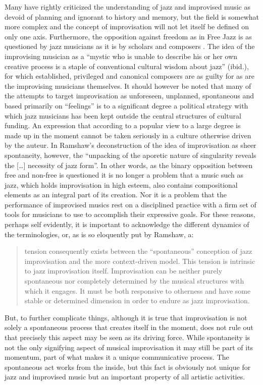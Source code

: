 \documentclass[a4paper]{article}
\begin{document}
Many have rightly criticized the understanding of jazz and improvised music as devoid of planning and ignorant to history and memory, but the field is somewhat more complex and the concept of improvisation will not let itself be defined on only one axis. Furthermore, the opposition against freedom as in Free Jazz is as questioned by jazz musicians as it is by scholars and composers \citep{lewis-1}. The idea of the improvising musician as a ``mystic who is unable to describe his or her own creative process is a staple of conventional cultural wisdom about jazz'' (ibid.), for which established, privileged and canonical composers are as guilty for as are the improvising musicians themselves. It should however be noted that many of the attempts to target improvisation as unforeseen, unplanned, spontaneous and based primarily on ``feelings'' is to a significant degree a political strategy with which jazz musicians has been kept outside the central structures of cultural funding. An expression that according to a popular view to a large degree is made up in the moment cannot be taken seriously in a culture otherwise driven by the auteur. In Ramshaw's deconstruction of the idea of improvisation as sheer spontaneity, however, the ``unpacking of the aporetic nature of singularity reveals the [\ldots] necessity of jazz form''. In other words, as the binary opposition between free and non-free is questioned it is no longer a problem that a music such as jazz, which holds improvisation in high esteem, also contains compositional elements as an integral part of its creation. Nor it is a problem that the performance of improvised musics rest on a disciplined practice with a firm set of tools for musicians to use to accomplish their expressive goals. For these reasons, perhaps self evidently, it is important to acknowledge the different dynamics of the terminologies, or, as is so eloquently put by Ramshaw, a:

\begin{quote}
 tension consequently exists between the ``spontaneous'' conception of jazz improvisation and   the more context-driven model. This tension is intrinsic to jazz improvisation   itself. Improvisation can be neither purely spontaneous nor completely determined by the   musical structures with which it engages. It must be both responsive to otherness and have   some stable or determined dimension in order to endure as jazz improvisation. \citep{ramshaw2006}
\end{quote}

But, to further complicate things, although it is true that improvisation is not solely a spontaneous process that creates itself in the moment, does not rule out that precisely this aspect may be seen as its driving force. While spontaneity is not the only signifying aspect of musical improvisation it may still be part of its momentum, part of what makes it a unique communicative process. The spontaneous act works from the inside, but this fact is obviously not unique for jazz and improvised music but an important property of all artistic activities. 
\end{document}
